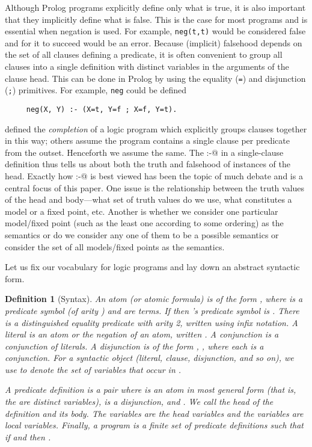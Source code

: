 \documentclass{tlp}
\newtheorem{definition}{Definition}
\begin{document}
Although Prolog programs explicitly define only what is true, it is also
important that they implicitly define what is false.  This is the case
for most programs and is essential when negation is used.  For example,
\texttt{neg(t,t)} would be considered false and for it to succeed would
be an error.  Because (implicit) falsehood depends on the set of all
clauses defining a predicate, it is often convenient to group all
clauses into a single definition with distinct variables in the
arguments of the clause head.  This can be done in Prolog by using the
equality (\texttt{=}) and disjunction (\texttt{;}) primitives.  For
example, \texttt{neg} could be defined 
\begin{verbatim}
     neg(X, Y) :- (X=t, Y=f ; X=f, Y=t).
\end{verbatim}
defined the \emph{completion} of a logic program which explicitly
groups clauses together in this way; others 
\cite{fitting:JLP_1991,sem3neg} assume
the program contains a single clause per predicate from the outset.
Henceforth we assume the same.  
The \verb@:-@ in a single-clause definition thus tells us about 
both the truth and falsehood of instances of the head.
Exactly how \verb@:-@ is best viewed has been the topic of much debate
and is a central focus of this paper.  One issue is the relationship
between the truth values of the head and body---what set of truth
values do we use, what constitutes a model or a fixed point, etc.
Another is whether we consider one particular model/fixed point (such
as the least one according to some ordering) as the semantics or do we
consider any one of them to be a possible semantics or consider the set
of all models/fixed points as the semantics.

Let us fix our vocabulary for logic programs and lay down
an abstract syntactic form.
\begin{definition}[Syntax] \rm
An atom (or atomic formula) is of the form
, where  is a predicate symbol (of arity )
and  are terms.
If  then 's predicate symbol 
is .
There is a distinguished equality predicate  with arity 2, written
using infix notation.
A \emph{literal} is an \emph{atom}  or the negation of an atom,
written .
A \emph{conjunction}  is a conjunction of literals.
A \emph{disjunction}  is of the form , 
, where each  is a conjunction.
For a syntactic object  (literal, clause, disjunction, and so on),
we use  to denote the set of variables that occur
in .

A \emph{predicate definition} is a pair  
where  is an atom in most general form  
(that is, the  are distinct variables), 
 is a disjunction, 
and .
We call  the \emph{head} of the definition and 
its \emph{body}.
The variables  are the \emph{head variables} 
and the variables  are \emph{local variables}.
Finally, a \emph{program} is a finite set  of predicate definitions 
such that if  and  then 
.
\end{definition}
\end{document}
